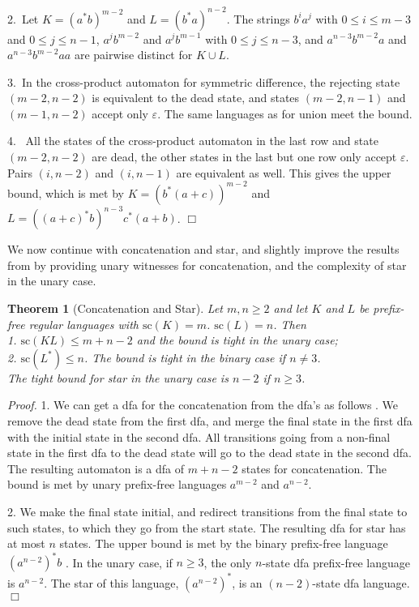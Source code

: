 \documentclass[copyright]{eptcs}
\newtheorem{theorem}{Theorem}
\newcommand{\eps}{\varepsilon}
\renewcommand{\sc}{\mathrm{sc}}
\renewcommand{\le}{\leqslant}
\renewcommand{\ge}{\geqslant}
\begin{document}
  2.~Let 
  $K=(a^*b)^{m-2}$ and
  $L=(b^*a)^{n-2}$. 
  The strings  $b^ia^j$ with  $0\le i \le m-3$ and $0\le j \le n-1$,
  $a^jb^{m-2}$ and  $a^jb^{m-1}$ with $  0\le j \le n-3$, 
  and $a^{n-3}b^{m-2}a$ and $a^{n-3}b^{m-2}aa$
  are pairwise distinct 
  for  $K\cup L$.
 
  3.~In the cross-product automaton for symmetric difference, the rejecting 
  state $(m-2,n-2)$ is equivalent to the dead state, and 
  states $(m-2,n-1)$ and $(m-1,n-2)$ accept only $\varepsilon$.
  The same languages as for union meet the bound.

  4.~ All the states 
  of the cross-product automaton
  in the last row and state $(m-2,n-2)$
  are dead,  the other states in the last but one row only accept $\eps$.
  Pairs $(i,n-2)$ and $(i,n-1)$ are equivalent as well.
  This gives the upper bound, 
  which is met by
  $K=(b^*(a+c))^{m-2}$ and
  $L=((a+c)^*b)^{n-3}c^*(a+b)$.
  \hfill$\Box$\bigskip

 We now continue with concatenation and star,
 and slightly improve the results from \cite{hs09}
 by providing unary witnesses for concatenation,
 and the complexity of star in the unary case.

 \begin{theorem}[Concatenation and Star]\label{thm:con,star}
  Let $m,n\ge2$
  and let  $K$ and $L$ be  prefix-free regular languages with  $\sc(K)=m$. $\sc(L)=n$.
  Then \\
  1. $\sc(KL)\le m+n-2$ and the bound is tight in the unary case;\\
  2. $\sc(L^*)\le n$. The bound is tight in the binary case if $n\neq3$.\\
  The tight bound for star in the unary case is $n-2$ if $n\ge3$.
 \end{theorem}

 \noindent\emph{Proof.}
  1. We can get a dfa for the concatenation
  from the dfa's   as follows \cite{hs09}.
  We remove the dead state from the first dfa,
  and merge  the final state in the first dfa  
  with the initial state in the second dfa. 
  All transitions going from a non-final state
  in the first dfa to the dead state will go to the dead state in the second dfa.
  The resulting automaton is a dfa of $m+n-2$ states for  concatenation.
  The bound is met 
  by unary prefix-free languages $a^{m-2}$ and $a^{n-2}$.

  2. We make the final state initial,
  and redirect  transitions  from the final state
  to such states, to which they go from the start state.
  The resulting dfa for star has at most $n$ states.
  The upper bound  is met by the binary prefix-free  
  language $(a^{n-2})^*b$ \cite{hs09}.
  In the unary case, if $n\ge3$, the only $n$-state dfa 
  prefix-free language is $a^{n-2}$.
  The star of this language, $(a^{n-2})^*$, is an $(n-2)$-state dfa language.
 \hfill$\Box$\medskip
\end{document}
